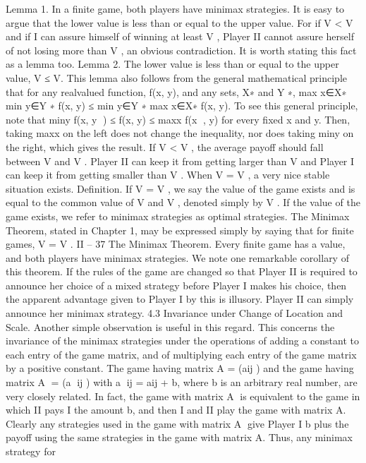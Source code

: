 \documentclass[]{report}
\begin{document}
Lemma 1. In a finite game, both players have minimax strategies.
It is easy to argue that the lower value is less than or equal to the upper value. For if
V < V and if I can assure himself of winning at least V , Player II cannot assure herself of
not losing more than V , an obvious contradiction. It is worth stating this fact as a lemma
too.
Lemma 2. The lower value is less than or equal to the upper value,
V ≤ V.
This lemma also follows from the general mathematical principle that for any realvalued
function, f(x, y), and any sets, X∗ and Y ∗,
max
x∈X∗ min
y∈Y ∗ f(x, y) ≤ min
y∈Y ∗ max
x∈X∗ f(x, y).
To see this general principle, note that miny f(x, y
) ≤ f(x, y) ≤ maxx f(x
, y) for every
fixed x and y. Then, taking maxx on the left does not change the inequality, nor does
taking miny on the right, which gives the result.
If V < V , the average payoff should fall between V and V . Player II can keep it from
getting larger than V and Player I can keep it from getting smaller than V . When V = V ,
a very nice stable situation exists.
Definition. If V = V , we say the value of the game exists and is equal to the common
value of V and V , denoted simply by V . If the value of the game exists, we refer to
minimax strategies as optimal strategies.
The Minimax Theorem, stated in Chapter 1, may be expressed simply by saying that
for finite games, V = V .
II – 37
The Minimax Theorem. Every finite game has a value, and both players have minimax
strategies.
We note one remarkable corollary of this theorem. If the rules of the game are changed
so that Player II is required to announce her choice of a mixed strategy before Player I
makes his choice, then the apparent advantage given to Player I by this is illusory. Player
II can simply announce her minimax strategy.
4.3 Invariance under Change of Location and Scale. Another simple observation
is useful in this regard. This concerns the invariance of the minimax strategies under
the operations of adding a constant to each entry of the game matrix, and of multiplying
each entry of the game matrix by a positive constant. The game having matrix A = (aij )
and the game having matrix A = (a
ij ) with a
ij = aij + b, where b is an arbitrary real
number, are very closely related. In fact, the game with matrix A is equivalent to the
game in which II pays I the amount b, and then I and II play the game with matrix A.
Clearly any strategies used in the game with matrix A give Player I b plus the payoff
using the same strategies in the game with matrix A. Thus, any minimax strategy for
\end{document}
